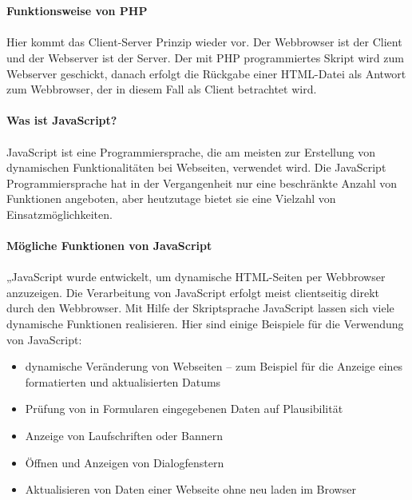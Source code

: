 \\
\\
\textbf{Funktionsweise von PHP} \\
\\
Hier kommt das Client-Server Prinzip wieder vor. Der Webbrowser ist der Client und der Webserver ist der Server. Der mit PHP programmiertes Skript wird zum Webserver geschickt, danach erfolgt die Rückgabe einer HTML-Datei als Antwort zum Webbrowser, der in diesem Fall als Client betrachtet wird.
\\
\\
\textbf{Was ist JavaScript?} \\
\\
JavaScript ist eine Programmiersprache, die am meisten zur Erstellung von dynamischen Funktionalitäten bei Webseiten, verwendet wird. Die JavaScript Programmiersprache hat in der Vergangenheit nur eine beschränkte Anzahl von Funktionen angeboten, aber heutzutage bietet sie eine Vielzahl von Einsatzmöglichkeiten. 
\\
\\
\textbf{Mögliche Funktionen von JavaScript} \\
\\
„JavaScript wurde entwickelt, um dynamische HTML-Seiten per Webbrowser anzuzeigen. Die Verarbeitung von JavaScript erfolgt meist clientseitig direkt durch den Webbrowser.
Mit Hilfe der Skriptsprache JavaScript lassen sich viele dynamische Funktionen realisieren. Hier sind einige Beispiele für die Verwendung von JavaScript:
\begin{itemize}
	\item  dynamische Veränderung von Webseiten – zum Beispiel für die Anzeige eines formatierten und aktualisierten Datums
\end{itemize}
\begin{itemize}
	\item Prüfung von in Formularen eingegebenen Daten auf Plausibilität
\end{itemize}
\begin{itemize}
	\item Anzeige von Laufschriften oder Bannern
\end{itemize}
\begin{itemize}
	\item 	Öffnen und Anzeigen von Dialogfenstern
\end{itemize}
\begin{itemize}
	\item Aktualisieren von Daten einer Webseite ohne neu laden im Browser
\end{itemize}
